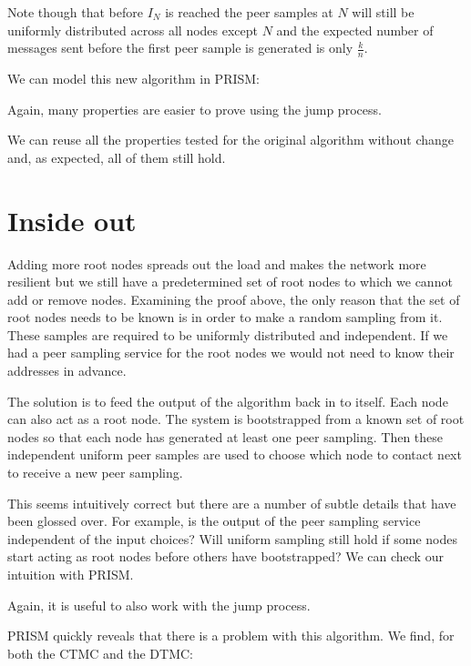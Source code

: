 \documentclass[a4paper,10pt]{article}
\newcommand{\code}[1]{
  \footnotesize
  
}
\newcommand{\prismmodel}[1]{
  \begin{quotation}
  \code{../models/#1.sm}
  \end{quotation}
}
\begin{document}
Note though that before $I_N$ is reached the peer samples at $N$ will still be uniformly distributed across all nodes except $N$ and the expected number of messages sent before the first peer sample is generated is only $\frac{k}{n}$.

We can model this new algorithm in PRISM:

\prismmodel{ctmc_multiple}

Again, many properties are easier to prove using the jump process.

\prismmodel{dtmc_multiple}

We can reuse all the properties tested for the original algorithm without change and, as expected, all of them still hold.

\section{Inside out}

Adding more root nodes spreads out the load and makes the network more resilient but we still have a predetermined set of root nodes to which we cannot add or remove nodes. Examining the proof above, the only reason that the set of root nodes needs to be known is in order to make a random sampling from it. These samples are required to be uniformly distributed and independent. If we had a peer sampling service for the root nodes we would not need to know their addresses in advance.

The solution is to feed the output of the algorithm back in to itself. Each node can also act as a root node. The system is bootstrapped from a known set of root nodes so that each node has generated at least one peer sampling. Then these independent uniform peer samples are used to choose which node to contact next to receive a new peer sampling.

This seems intuitively correct but there are a number of subtle details that have been glossed over. For example, is the output of the peer sampling service independent of the input choices? Will uniform sampling still hold if some nodes start acting as root nodes before others have bootstrapped? We can check our intuition with PRISM.

\prismmodel{ctmc_broken}

Again, it is useful to also work with the jump process.

\prismmodel{dtmc_broken}

PRISM quickly reveals that there is a problem with this algorithm. We find, for both the CTMC and the DTMC:
\end{document}
